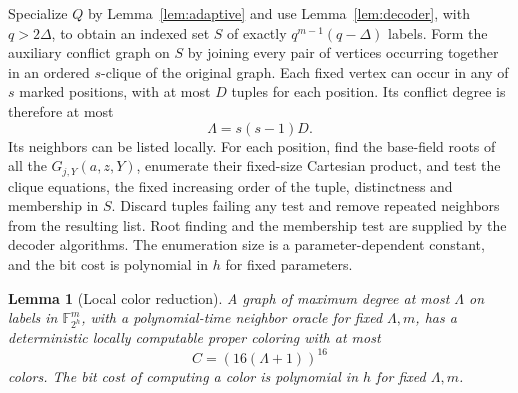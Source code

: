 \documentclass[11pt,a4paper]{article}
\newcommand{\F}{\mathbb F}
\newtheorem{lemma}[theorem]{Lemma}
\theoremstyle{definition}
\theoremstyle{remark}
\numberwithin{equation}{section}
\begin{document}
Specialize $Q$ by Lemma~\ref{lem:adaptive} and use Lemma~\ref{lem:decoder}, with $q>2\Delta$, to obtain an indexed set $S$ of exactly $q^{m-1}(q-\Delta)$ labels. Form the auxiliary conflict graph on $S$ by joining every pair of vertices occurring together in an ordered $s$-clique of the original graph. Each fixed vertex can occur in any of $s$ marked positions, with at most $D$ tuples for each position. Its conflict degree is therefore at most
\begin{equation}\label{eq:Lambda}
\Lambda=s(s-1)D.
\end{equation}
Its neighbors can be listed locally. For each position, find the base-field roots of all the $G_{j,Y}(a,z,Y)$, enumerate their fixed-size Cartesian product, and test the clique equations, the fixed increasing order of the tuple, distinctness and membership in $S$. Discard tuples failing any test and remove repeated neighbors from the resulting list. Root finding and the membership test are supplied by the decoder algorithms. The enumeration size is a parameter-dependent constant, and the bit cost is polynomial in $h$ for fixed parameters.

\begin{lemma}[Local color reduction]\label{lem:color}
A graph of maximum degree at most $\Lambda$ on labels in $\F_{2^h}^m$, with a polynomial-time neighbor oracle for fixed $\Lambda,m$, has a deterministic locally computable proper coloring with at most
\begin{equation}\label{eq:palette}
C=(16(\Lambda+1))^{16}
\end{equation}
colors. The bit cost of computing a color is polynomial in $h$ for fixed $\Lambda,m$.
\end{lemma}
\end{document}
